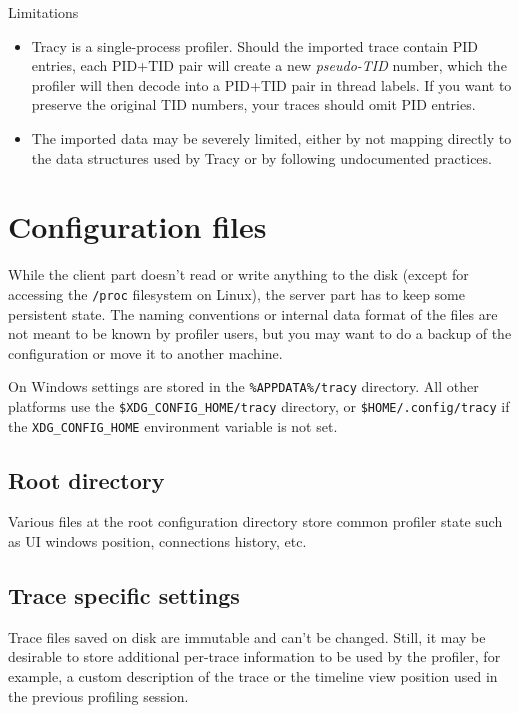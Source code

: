 \documentclass[hidelinks,titlepage,a4paper]{article}
\begin{document}
\begin{bclogo}[
noborder=true,
couleur=black!5,
logo=\bcattention
]{Limitations}
\begin{itemize}
\item Tracy is a single-process profiler. Should the imported trace contain PID entries, each PID+TID pair will create a new \emph{pseudo-TID} number, which the profiler will then decode into a PID+TID pair in thread labels. If you want to preserve the original TID numbers, your traces should omit PID entries.
\item The imported data may be severely limited, either by not mapping directly to the data structures used by Tracy or by following undocumented practices.
\end{itemize}
\end{bclogo}

\section{Configuration files}
\label{configurationfiles}

While the client part doesn't read or write anything to the disk (except for accessing the \texttt{/proc} filesystem on Linux), the server part has to keep some persistent state. The naming conventions or internal data format of the files are not meant to be known by profiler users, but you may want to do a backup of the configuration or move it to another machine.

On Windows settings are stored in the \texttt{\%APPDATA\%/tracy} directory. All other platforms use the \texttt{\$XDG\_CONFIG\_HOME/tracy} directory, or \texttt{\$HOME/.config/tracy} if the \texttt{XDG\_CONFIG\_HOME} environment variable is not set.

\subsection{Root directory}

Various files at the root configuration directory store common profiler state such as UI windows position, connections history, etc.

\subsection{Trace specific settings}
\label{tracespecific}

Trace files saved on disk are immutable and can't be changed. Still, it may be desirable to store additional per-trace information to be used by the profiler, for example, a custom description of the trace or the timeline view position used in the previous profiling session.
\end{document}
